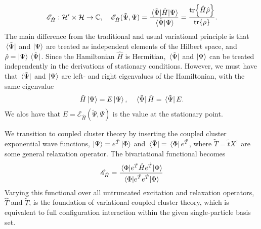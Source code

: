 \begin{equation}
    \label{eq:bivariational_principle}
    \mathscr{E}_{\hat{H}} : \mathcal{H}' \times \mathcal{H} \to \mathbb{C},
    \quad
    \mathscr{E}_{\hat{H}}(\tilde{\Psi}, \Psi) 
        = \frac{\mel*{\tilde{\Psi}}{\hat{H}}{\Psi}}{\braket*{\tilde{\Psi}}{\Psi}}
        = \frac{\tr{\hat{H}\hat{\rho}}}{\tr{\rho}}.
\end{equation}
The main difference from the traditional and usual variational principle is that 
$\bra*{\tilde{\Psi}}$ and $\ket{\Psi}$ are treated as independent elements of the
Hilbert space, and $\hat{\rho} = \ket{\Psi}\bra*{\tilde{\Psi}}$.
Since the Hamiltonian $\hat{H}$ is Hermitian, $\bra*{\tilde{\Psi}}$ and $\ket{\Psi}$
can be treated 
independently in the derivations of stationary conditions. However, we must have that
$\bra*{\tilde{\Psi}}$ and $\ket{\Psi}$ are left- 
and right eigenvalues of the Hamiltonian, with the same eigenvalue
\begin{equation}
    \hat{H}\ket{\Psi} = E\ket{\Psi}, \quad \bra*{\tilde{\Psi}}\hat{H} = \bra*{\tilde{\Psi}}E.
\end{equation}
We alos have that $E = \mathcal{E}_{\hat{H}}(\tilde{\Psi}, \Psi)$ is the value at the
stationary point.

We transition to coupled cluster theory by inserting the coupled cluster exponential 
wave functions, $\ket{\Psi} = e^{\hat{T}}\ket{\Phi}$ and 
$\bra*{\tilde{\Psi}} = \bra*{\Phi}e^{\tilde{T}}$, where 
$\tilde{T} = \tilde{t}X^\dagger$ are some general relaxation operator. The 
bivariational functional becomes 
\begin{equation}
    \label{eq:bivariational_principle_cc}
    \mathscr{E}_{\hat{H}} 
    = \frac{\mel{\Phi}{e^{\tilde{T}}\hat{H}e^{\hat{T}}}{\Phi}}
        {\mel{\Phi}{e^{\tilde{T}}e^{\hat{T}}}{\Phi}}
\end{equation}
Varying this functional over all untruncated excitation and relaxation operators,
$\hat{T}$ and $\tilde{T}$, is the foundation of variational coupled cluster
theory\cite{bartlett1988expectation}, which is equivalent to full configuration 
interaction within the given single-particle basis set.

